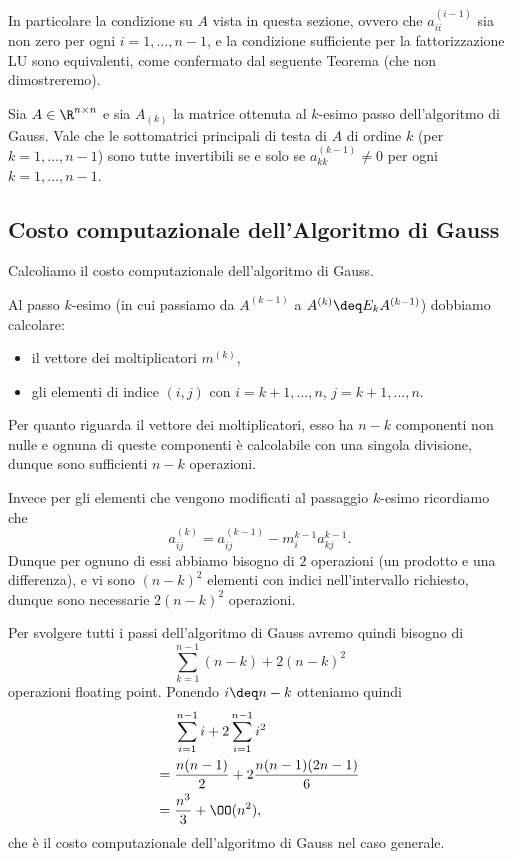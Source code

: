 In particolare la condizione su $A$ vista in questa sezione, ovvero che $a_{ii}^{(i-1)}$ sia non zero per ogni $i = 1, \dots, n-1$, e la condizione sufficiente per la fattorizzazione LU sono equivalenti, come confermato dal seguente Teorema (che non dimostreremo).

\begin{proposition}
    {}{}
    Sia $A \in \Mat{\R, n, n}$ e sia $A_{(k)}$ la matrice ottenuta al $k$-esimo passo dell'algoritmo di Gauss. Vale che le sottomatrici principali di testa di $A$ di ordine $k$ (per $k = 1, \dots, n-1$) sono tutte invertibili se e solo se $a_{kk}^{(k-1)} \neq 0$ per ogni $k = 1, \dots, n-1$.  
\end{proposition}

\subsection{Costo computazionale dell'Algoritmo di Gauss}

Calcoliamo il costo computazionale dell'algoritmo di Gauss. 

Al passo $k$-esimo (in cui passiamo da $A^{(k-1)}$ a $A^{(k)} \deq E_kA^{(k-1)}$) dobbiamo calcolare:
\begin{itemize}
    \item il vettore dei moltiplicatori $m^{(k)}$,
    \item gli elementi di indice $(i, j)$ con $i = k+1, \dots, n$, $j = k+1, \dots, n$.
\end{itemize}

Per quanto riguarda il vettore dei moltiplicatori, esso ha $n-k$ componenti non nulle e ognuna di queste componenti è calcolabile con una singola divisione, dunque sono sufficienti $n-k$ operazioni.

Invece per gli elementi che vengono modificati al passaggio $k$-esimo ricordiamo che \[
    a_{ij}^{(k)} = a_{ij}^{(k-1)} - m_i^{k-1}a_{kj}^{k-1}.
\] Dunque per ognuno di essi abbiamo bisogno di $2$ operazioni (un prodotto e una differenza), e vi sono $(n-k)^2$ elementi con indici nell'intervallo richiesto, dunque sono necessarie $2(n-k)^2$ operazioni.

Per svolgere tutti i passi dell'algoritmo di Gauss avremo quindi bisogno di \[
    \sum_{k=1}^{n-1} (n-k) + 2(n-k)^2
\] operazioni floating point.
Ponendo $i \deq n-k$ otteniamo quindi \begin{align*}
    &\sum_{i=1}^{n-1} i + 2\sum_{i=1}^{n-1} i^2 \\
    = {}&\frac{n(n-1)}{2} + 2\frac{n(n-1)(2n-1)}{6} \\
    = {}&\frac{n^3}{3} + \OO(n^2),
\end{align*} che è il costo computazionale dell'algoritmo di Gauss nel caso generale.

